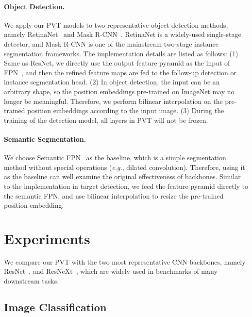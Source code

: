 \documentclass[10pt,twocolumn,letterpaper]{article}
\def\eg{\emph{e.g.}}
\begin{document}
\paragraph{Object Detection.} 
We apply our PVT models to two representative object detection methods, namely RetinaNet~\cite{lin2017focal} and Mask R-CNN~\cite{he2017mask}.
RetinaNet is a widely-used single-stage detector, and Mask R-CNN is one of the mainstream two-stage instance segmentation frameworks. 
The implementation details are listed as follows: (1) Same as ResNet, we directly use the output feature pyramid  as the input of FPN~\cite{lin2017feature}, and then the refined feature maps are fed to the follow-up detection or instance segmentation head.
(2) In object detection, the input can be an arbitrary shape, so the position embeddings pre-trained on ImageNet may no longer be meaningful. Therefore, we perform bilinear interpolation on the pre-trained position embeddings according to the input image. 
(3) During the training of the detection model, all layers in PVT will not be frozen.

\paragraph{Semantic Segmentation.}
We choose Semantic FPN~\cite{kirillov2019panoptic} as the baseline, which is a simple segmentation method without special operations (\eg, dilated convolution). Therefore, using it as the baseline can well examine the original effectiveness of backbones. Similar to the implementation in target detection, we feed the feature pyramid directly to the semantic FPN, and use bilinear interpolation to resize the pre-trained position embedding.


\section{Experiments}
We compare our PVT with the two most representative CNN backbones, namely ResNet~\cite{he2016deep}, and ResNeXt~\cite {xie2017aggregated}, which are widely used in benchmarks of many downstream tasks.


\subsection{Image Classification}
\label{sec:cls}
\end{document}
